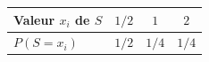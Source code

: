 \begingroup\renewcommand{\arraystretch}{1.35}
\begin{tabular}{@{}lccc@{}}\toprule
Valeur $x_i$ de $S$ & $1/2$ & $1$ & $2$\\\midrule
$P(S=x_i)$ & $1/2$ & $1/4$ & $1/4$\\
\bottomrule\end{tabular}\endgroup

\par\smallskip{}
